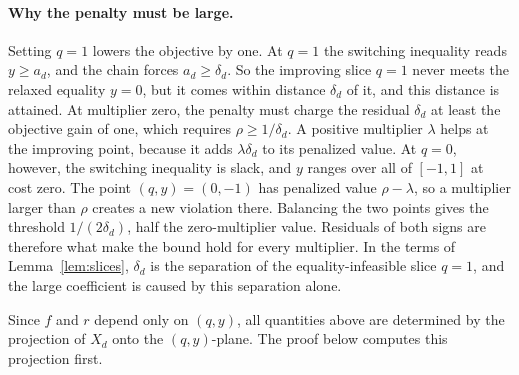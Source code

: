 \paragraph{Why the penalty must be large.}
Setting $q=1$ lowers the objective by one. At $q=1$ the switching
inequality reads $y\ge a_d$, and the chain forces $a_d\ge\delta_d$. So the
improving slice $q=1$ never meets the relaxed equality $y=0$, but it comes
within distance $\delta_d$ of it, and this distance is attained. At
multiplier zero, the penalty must charge the residual $\delta_d$ at least
the objective gain of one, which requires $\rho\ge1/\delta_d$. A positive
multiplier $\lambda$ helps at the improving point, because it adds
$\lambda\delta_d$ to its penalized value. At $q=0$, however, the switching
inequality is slack, and $y$ ranges over all of $[-1,1]$ at cost zero. The
point $(q,y)=(0,-1)$ has penalized value $\rho-\lambda$, so a multiplier
larger than $\rho$ creates a new violation there. Balancing the two points
gives the threshold $1/(2\delta_d)$, half the zero-multiplier value.
Residuals of both signs are therefore what make the bound hold for every
multiplier. In the terms of Lemma~\ref{lem:slices}, $\delta_d$ is the
separation of the equality-infeasible slice $q=1$, and the large
coefficient is caused by this separation alone.

Since $f$ and $r$ depend only on $(q,y)$, all quantities above are
determined by the projection of $X_d$ onto the $(q,y)$-plane. The proof
below computes this projection first.

